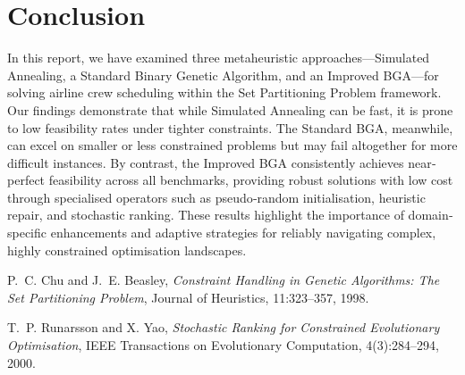 \documentclass[12pt]{article}
\begin{document}
\section{Conclusion}
\label{sec:conclusion}

In this report, we have examined three metaheuristic approaches—Simulated Annealing, a Standard Binary Genetic Algorithm, and an Improved BGA—for solving airline crew scheduling within the Set Partitioning Problem framework. Our findings demonstrate that while Simulated Annealing can be fast, it is prone to low feasibility rates under tighter constraints. The Standard BGA, meanwhile, can excel on smaller or less constrained problems but may fail altogether for more difficult instances. By contrast, the Improved BGA consistently achieves near‐perfect feasibility across all benchmarks, providing robust solutions with low cost through specialised operators such as pseudo‐random initialisation, heuristic repair, and stochastic ranking. These results highlight the importance of domain‐specific enhancements and adaptive strategies for reliably navigating complex, highly constrained optimisation landscapes.
\newpage

\begin{thebibliography}{9}
  P.~C. Chu and J.~E. Beasley, 
  \emph{Constraint Handling in Genetic Algorithms: The Set Partitioning Problem},
  Journal of Heuristics, 11:323--357, 1998.

  T.~P. Runarsson and X. Yao, 
  \emph{Stochastic Ranking for Constrained Evolutionary Optimisation},
  IEEE Transactions on Evolutionary Computation, 4(3):284--294, 2000.
\end{thebibliography}
\end{document}
